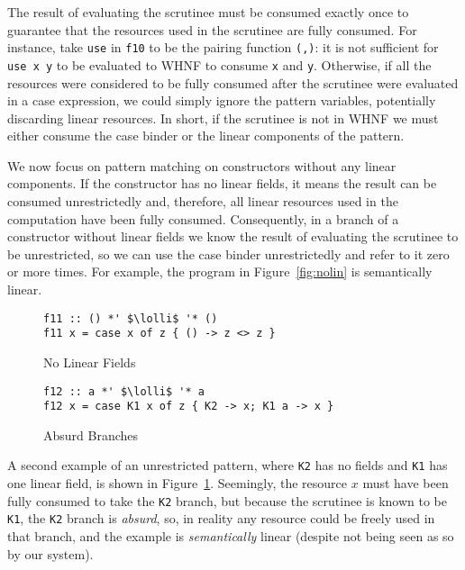 \documentclass[acmsmall,review,anonymous,screen]{acmart}
\newcommand{\incode}[1]{\lstinline{#1}}
\newcommand{\lolli}{\multimap}
\begin{document}
%
The result of evaluating the scrutinee must be consumed exactly once to guarantee
that the resources used in the scrutinee are fully consumed. %
For instance, take
\incode{use} in \incode{f10} to be the pairing function \incode{(,)}: it is not sufficient for \incode{use x y} to be
evaluated to WHNF to consume \incode{x} and \incode{y}. Otherwise, if all the resources were
considered to be fully consumed after the scrutinee were evaluated in a case
expression, we could simply ignore the pattern variables, potentially
discarding linear resources. In
short, if the scrutinee is not in WHNF we must either consume the case binder
or the linear components of the pattern.


We now focus on pattern matching on constructors without
any linear components. If the constructor has no linear fields, it means the
result can be consumed unrestrictedly and, therefore, all linear resources used
in the computation have been fully consumed.
%
Consequently, in a branch of a constructor without linear fields we know the
result of evaluating the scrutinee to be unrestricted, so we can use the case
binder unrestrictedly and refer to it zero or more times. For example,
the program in Figure~\ref{fig:nolin} is semantically linear.
%
\begin{figure}[t]
 \begin{minipage}{0.5\textwidth}
\begin{notyet}
\begin{lstlisting}
f11 :: () *' $\lolli$ '* ()
f11 x = case x of z { () -> z <> z }
\end{lstlisting}
\end{notyet}
\vspace{-0.5cm}
\caption{No Linear Fields\label{fig:nolin}}
\end{minipage}%
\begin{minipage}{0.5\textwidth}
\begin{limitation}
\begin{lstlisting}
f12 :: a *' $\lolli$ '* a
f12 x = case K1 x of z { K2 -> x; K1 a -> x }
\end{lstlisting}
\end{limitation}
\vspace{-0.5cm}
\caption{Absurd Branches\label{fig:absurd}}
\end{minipage}
\end{figure}
%
A second example of an unrestricted pattern, where \incode{K2} has no fields and \incode{K1}
has one linear field, is shown in Figure~\ref{fig:absurd}. Seemingly, the resource
$x$ must have been fully consumed to take the \incode{K2} branch, but because the
scrutinee is known to be \incode{K1}, the \incode{K2} branch is \emph{absurd}, so, in reality
any resource could be freely used in that branch, and the example is
\emph{semantically} linear (despite not being seen as so by our system).
\end{document}
